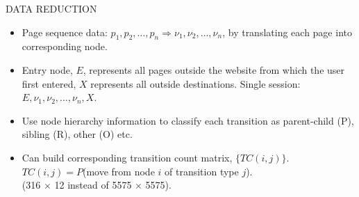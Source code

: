 \documentclass{report}
\newcommand{\head}[1]
{
  \begin{center}
      {\huge {\color{blue} #1}}
    \end{center}
  }
\begin{document}
\newpage
\head{DATA REDUCTION}
\begin{itemize}
\item Page sequence data: $p_1,p_2,\dots,p_n \Rightarrow
  \nu_1,\nu_2,\dots,\nu_n$, by translating each page into
  corresponding node.
\item Entry node, $E$, represents all pages outside the website from
  which the user first entered, $X$ represents all outside
  destinations. Single session: $E, \nu_1,\nu_2,\dots,\nu_n, X$.
\item Use node hierarchy information to classify each transition as
  parent-child (P), sibling (R), other (O) etc.
\item Can build corresponding transition count matrix, $\{TC(i,j)\}$.\\ 
$TC(i,j)=P$(move from node $i$ of transition type $j$).\\
(316 $\times$ 12 instead of 5575 $\times$ 5575).
\end{itemize}
\end{document}
